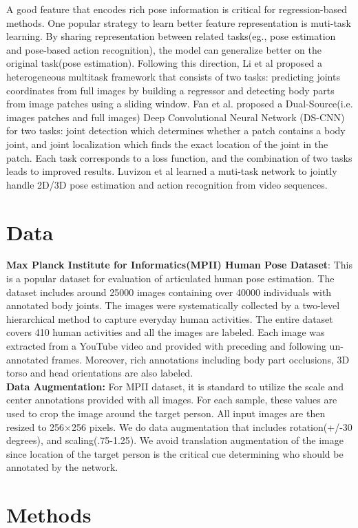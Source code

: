 \documentclass[final]{cvpr}
\begin{document}
\indent A good feature that encodes rich pose information is critical for regression-based methods. One popular strategy to learn better feature representation is muti-task learning. By sharing representation between related tasks(eg., pose estimation and pose-based action recognition), the model can generalize better on the original task(pose estimation). Following this direction, Li et al\cite{li2014heterogeneous} proposed a heterogeneous multitask framework that consists of two tasks: predicting joints coordinates from full images by building a regressor and detecting body parts from image patches using a sliding window. Fan et al.\cite{fan2015combining} proposed a Dual-Source(i.e. images patches and full images) Deep Convolutional Neural Network (DS-CNN) for two tasks: joint detection which determines whether a patch contains a body joint, and joint localization which finds the exact location of the joint in the patch. Each task corresponds to a loss function, and the combination of two tasks leads to improved results. Luvizon et al\cite{luvizon2019human} learned a muti-task network to jointly handle 2D/3D pose estimation and action recognition from video sequences.
\section{Data}
\noindent \textbf{Max Planck Institute for Informatics(MPII) Human Pose Dataset}: This is a popular dataset for evaluation of articulated human pose estimation. The dataset includes around 25000 images containing over 40000 individuals with annotated body joints. The images were systematically collected by a two-level hierarchical method to capture everyday human activities. The entire dataset covers 410 human activities and all the images are labeled. Each image was extracted from a YouTube video and provided with preceding and following un-annotated frames. Moreover, rich annotations including body part occlusions, 3D torso and head orientations are also labeled.\\
\textbf{Data Augmentation:} For MPII dataset, it is standard to utilize the scale and center annotations provided with all images. For each sample, these values are used to crop the image around the target person. All input images are then resized to 256$\times$256 pixels. We do data augmentation that includes rotation(+/-30 degrees), and scaling(.75-1.25). We avoid translation augmentation of the image since location of the target person is the critical cue determining who should be annotated by the network.
\section{Methods}
\end{document}
